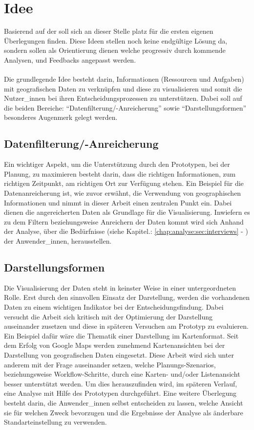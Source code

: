 \documentclass[Bachelorarbeit.tex]{subfiles}
\begin{document}
\section{Idee}
\label{chap:einfuehrung:sec:idee}

Basierend auf der  soll sich an dieser Stelle platz für die ersten eigenen Überlegungen finden. 
Diese Ideen stellen noch keine endgültige Lösung da, sondern sollen als Orientierung dienen welche progressiv durch kommende Analysen,  und Feedbacks angepasst werden.\\
\\
Die grundlegende Idee besteht darin, Informationen (Ressourcen und Aufgaben) mit geografischen Daten zu verknüpfen und diese zu visualisieren und somit die Nutzer\_innen bei ihren Entscheidungsprozessen zu unterstützen. 
Dabei soll auf die beiden Bereiche: ``Datenfilterung/-Anreicherung'' sowie ``Darstellungsformen'' besonderes Augenmerk gelegt werden.

\subsection*{Datenfilterung/-Anreicherung}
Ein wichtiger Aspekt, um die Unterstützung durch den Prototypen, bei der Planung, zu maximieren besteht darin, dass die richtigen Informationen, zum richtigen Zeitpunkt, am richtigen Ort zur Verfügung stehen. 
Ein Beispiel für die Datenanreicherung ist, wie zuvor erwähnt, die Verwendung von geographischen Informationen und nimmt in dieser Arbeit einen zentralen Punkt ein. 
Dabei dienen die angereicherten Daten als Grundlage für die Visualisierung.
Inwiefern es zu dem Filtern beziehungsweise Anreichern der Daten kommt wird sich Anhand der Analyse, über die Bedürfnisse (siehe Kapitel.: \ref{chap:analyse:sec:interviews} - ) der Anwender\_innen, herausstellen.

\subsection*{Darstellungsformen}
Die Visualisierung der Daten steht in keinster Weise in einer untergeordneten Rolle.
Erst durch den sinnvollen Einsatz der Darstellung, werden die vorhandenen Daten zu einem wichtigen Indikator bei der Entscheidungsfindung.
Dabei versucht die Arbeit sich kritisch mit der Optimierung der Darstellung auseinander zusetzen und diese in späteren Versuchen am Prototyp zu evaluieren.
Ein Beispiel dafür wäre die Thematik einer Darstellung im Kartenformat.
Seit dem Erfolg von Google Maps werden zunehmend Kartenansichten bei der Darstellung von geografischen Daten eingesetzt. 
Diese Arbeit wird sich unter anderem mit der Frage auseinander setzen, welche Planungs-Szenarios, beziehungsweise Workflow-Schritte, durch eine Karten- und/oder Listenansicht besser unterstützt werden.
Um dies herauszufinden wird, im späteren Verlauf, eine Analyse mit Hilfe des Prototypen durchgeführt.
Eine weitere Überlegung besteht darin, die Anwender\_innen selbst entscheiden zu lassen, welche Ansicht sie für welchen Zweck bevorzugen und die Ergebnisse der Analyse als änderbare Standarteinstellung zu verwenden.
\end{document}

